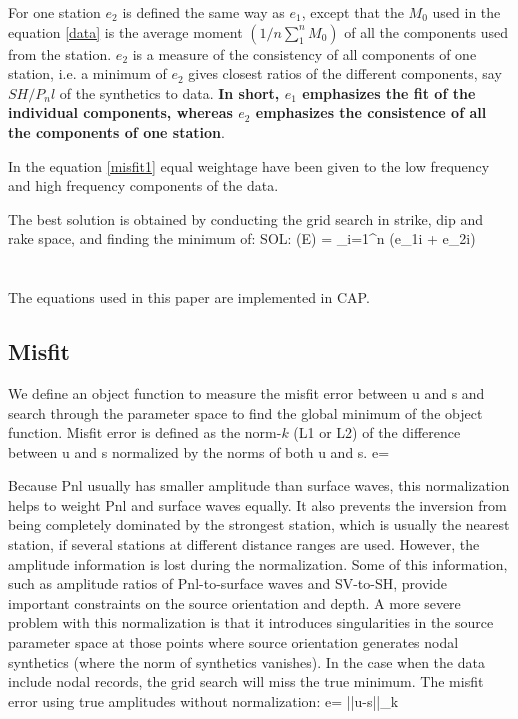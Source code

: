 \documentclass[11pt,titlepage,fleqn]{article}
\begin{document}
For one station $e_2$ is defined the same way as $e_1$, except that the $M_0$ used in the equation \ref{data} is the average moment $(1/n\sum_1^n M_0)$ of all the components used from the station. $e_2$ is a measure of the consistency of all components of one station, i.e. a minimum of $e_2$ gives closest ratios of the different components, say $SH/P_nl$ of the synthetics to data. {\bf In short, $e_1$ emphasizes the fit of the individual components, whereas $e_2$ emphasizes the consistence of all the components of one station}.

In the equation \ref{misfit1} equal weightage have been given to the low frequency and high frequency components of the data.

The best solution is obtained by conducting the grid search in strike, dip and rake space, and finding the minimum of:
\eq
SOL: \min(E) =  \sum_{i=1}^{n} (e_{1i} + e_{2i})
\en

\section{\cite{Zhu_Helm_1996}}
The equations used in this paper are implemented in CAP. 
\subsection{Misfit}
We define an object function to measure the misfit error between u and s and search through the parameter space to find the global minimum of the object function.
Misfit error is defined as the norm-$k$ (L1 or L2) of the difference between u and s normalized by the norms of both u and s.
\eq
e= 
\en

Because Pnl usually has smaller amplitude than surface waves, this normalization helps to weight Pnl and surface waves equally. It also prevents the inversion from being completely dominated by the strongest station, which is usually the nearest station, if several stations at different distance ranges are used. However, the amplitude information is lost during the normalization. Some of this information, such as amplitude ratios of Pnl-to-surface waves and SV-to-SH, provide important constraints on the source orientation and depth. A more severe problem with this normalization is that it introduces singularities in the source parameter space at those points where source orientation generates nodal synthetics (where the norm of synthetics vanishes). In the case when the data include nodal records, the grid search will miss the true minimum. The misfit error using true amplitudes without normalization:
\eq
e= {||u-s||_k}
\en
\end{document}
